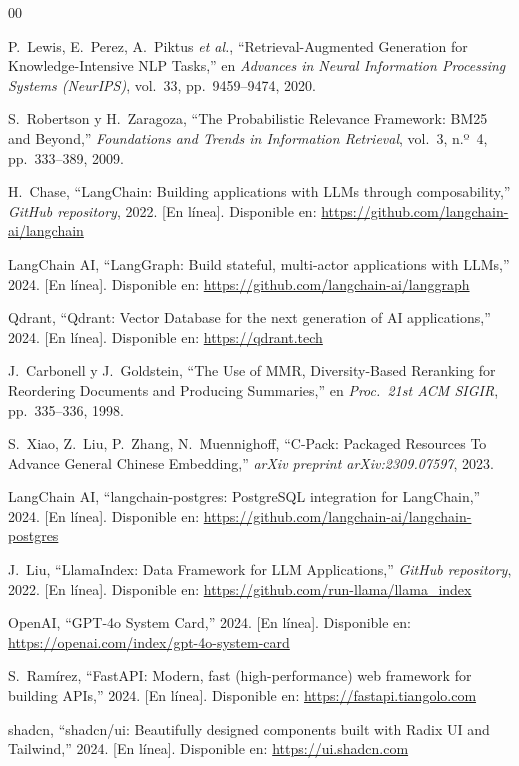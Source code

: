 \documentclass[conference]{IEEEtran}
\begin{document}
\begin{thebibliography}{00}

P.~Lewis, E.~Perez, A.~Piktus \textit{et al.},
``Retrieval-Augmented Generation for Knowledge-Intensive NLP Tasks,''
en \textit{Advances in Neural Information Processing Systems (NeurIPS)},
vol.~33, pp.~9459--9474, 2020.

S.~Robertson y H.~Zaragoza,
``The Probabilistic Relevance Framework: BM25 and Beyond,''
\textit{Foundations and Trends in Information Retrieval},
vol.~3, n.º~4, pp.~333--389, 2009.

H.~Chase,
``LangChain: Building applications with LLMs through composability,''
\textit{GitHub repository}, 2022.
[En línea]. Disponible en: \url{https://github.com/langchain-ai/langchain}

LangChain AI,
``LangGraph: Build stateful, multi-actor applications with LLMs,''
2024.
[En línea]. Disponible en: \url{https://github.com/langchain-ai/langgraph}

Qdrant,
``Qdrant: Vector Database for the next generation of AI applications,''
2024.
[En línea]. Disponible en: \url{https://qdrant.tech}

J.~Carbonell y J.~Goldstein,
``The Use of MMR, Diversity-Based Reranking for Reordering Documents
and Producing Summaries,''
en \textit{Proc.\ 21st ACM SIGIR}, pp.~335--336, 1998.

S.~Xiao, Z.~Liu, P.~Zhang, N.~Muennighoff,
``C-Pack: Packaged Resources To Advance General Chinese Embedding,''
\textit{arXiv preprint arXiv:2309.07597}, 2023.

LangChain AI,
``langchain-postgres: PostgreSQL integration for LangChain,''
2024.
[En línea]. Disponible en: \url{https://github.com/langchain-ai/langchain-postgres}

J.~Liu,
``LlamaIndex: Data Framework for LLM Applications,''
\textit{GitHub repository}, 2022.
[En línea]. Disponible en: \url{https://github.com/run-llama/llama_index}

OpenAI,
``GPT-4o System Card,''
2024.
[En línea]. Disponible en: \url{https://openai.com/index/gpt-4o-system-card}

S.~Ramírez,
``FastAPI: Modern, fast (high-performance) web framework for building APIs,''
2024.
[En línea]. Disponible en: \url{https://fastapi.tiangolo.com}

shadcn,
``shadcn/ui: Beautifully designed components built with Radix UI and Tailwind,''
2024.
[En línea]. Disponible en: \url{https://ui.shadcn.com}

\end{thebibliography}
\end{document}
